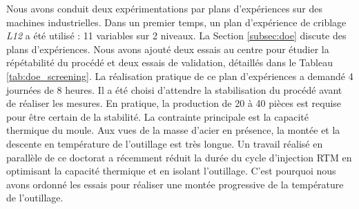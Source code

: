 Nous avons conduit deux expérimentations par plans d'expériences sur des machines industrielles.
Dans un premier temps, un plan d'expérience de criblage \textit{L12} a été utilisé \cite{plackett_design_1946} : 11 variables sur 2 niveaux.
La Section \ref{subsec:doe} discute des plans d'expériences.
Nous avons ajouté deux essais au centre pour étudier la répétabilité du procédé et deux essais de validation, détaillés dans le Tableau \ref{tab:doe_screening}.
La réalisation pratique de ce plan d'expériences a demandé 4 journées de 8 heures.
Il a été choisi d'attendre la stabilisation du procédé avant de réaliser les mesures.
En pratique, la production de 20 à 40 pièces est requise pour être certain de la stabilité.
La contrainte principale est la capacité thermique du moule.
Aux vues de la masse d'acier en présence, la montée et la descente en température de l'outillage est très longue.
Un travail réalisé en parallèle de ce doctorat \cite{collomb_2018} a récemment réduit la durée du cycle d'injection RTM en optimisant la capacité thermique et en isolant l'outillage.
C'est pourquoi nous avons ordonné les essais pour réaliser une montée progressive de la température de l'outillage.

\makeatletter
\newcommand*{\yncellcolor}{}
\def\yncellcolor\ignorespaces{}
\newcolumntype{m}{>{\yncellcolor}c}
\makeatother

